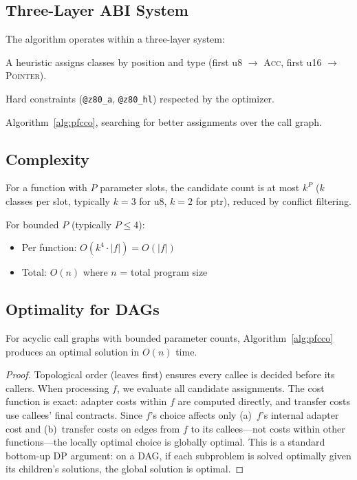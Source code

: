 \documentclass[sigplan,screen,nonacm]{acmart}
\begin{document}
\subsection{Three-Layer ABI System}

The algorithm operates within a three-layer system:
\begin{description}[style=unboxed]
\item[Layer~1: Positional defaults.]  A heuristic assigns classes by
  position and type (first u8 $\to$ \textsc{Acc}, first u16 $\to$
  \textsc{Pointer}).
\item[Layer~2: User annotations.]  Hard constraints
  (\texttt{@z80\_a}, \texttt{@z80\_hl}) respected by the optimizer.
\item[Layer~3: Contract optimizer (PFCCO).]  Algorithm~\ref{alg:pfcco},
  searching for better assignments over the call graph.
\end{description}

\subsection{Complexity}

For a function with $P$ parameter slots, the candidate count is at most
$k^P$ ($k$ classes per slot, typically $k=3$ for u8, $k=2$ for ptr),
reduced by conflict filtering.

For bounded $P$ (typically $P \le 4$):
\begin{itemize}
\item Per function: $O(k^4 \cdot |f|) = O(|f|)$
\item Total: $O(n)$ where $n$ = total program size
\end{itemize}

\subsection{Optimality for DAGs}

\begin{theorem}
For acyclic call graphs with bounded parameter counts,
Algorithm~\ref{alg:pfcco} produces an optimal solution in $O(n)$ time.
\end{theorem}

\begin{proof}
Topological order (leaves first) ensures every callee is decided before its
callers.  When processing $f$, we evaluate all candidate assignments.  The
cost function is exact: adapter costs within $f$ are computed directly, and
transfer costs use callees' final contracts.  Since $f$'s choice affects
only (a)~$f$'s internal adapter cost and (b)~transfer costs on edges from
$f$ to its callees---not costs within other functions---the locally optimal
choice is globally optimal.  This is a standard bottom-up DP argument: on a
DAG, if each subproblem is solved optimally given its children's solutions,
the global solution is optimal.
\end{proof}
\end{document}
